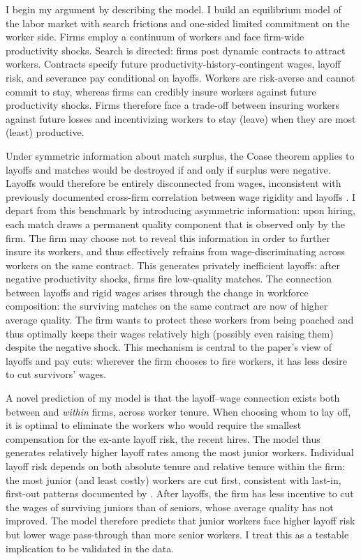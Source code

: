 I begin my argument by describing the model. I build an equilibrium model of the labor market with search frictions and one-sided limited commitment on the worker side. Firms employ a continuum of workers and face firm-wide productivity shocks. Search is directed: firms post dynamic contracts to attract workers. Contracts specify future productivity-history-contingent wages, layoff risk, and severance pay conditional on layoffs. Workers are risk-averse and cannot commit to stay, whereas firms can credibly insure workers against future productivity shocks. Firms therefore face a trade-off between insuring workers against future losses and incentivizing workers to stay (leave) when they are most (least) productive.
 
Under symmetric information about match surplus, the Coase theorem applies to layoffs and matches would be destroyed if and only if surplus were negative. Layoffs would therefore be entirely disconnected from wages, inconsistent with previously documented cross-firm correlation between wage rigidity and layoffs \parencite[]{dias2013,enrlich2024}. I depart from this benchmark by introducing asymmetric information: upon hiring, each match draws a permanent quality component that is observed only by the firm. The firm may choose not to reveal this information in order to further insure its workers, and thus effectively refrains from wage-discriminating across workers on the same contract. This generates privately inefficient layoffs: after negative productivity shocks, firms fire low-quality matches. The connection between layoffs and rigid wages arises through the change in workforce composition: the surviving matches on the same contract are now of higher average quality. The firm wants to protect these workers from being poached and thus optimally keeps their wages relatively high (possibly even raising them) despite the negative shock. This mechanism is central to the paper’s view of layoffs and pay cuts: wherever the firm chooses to fire workers, it has less desire to cut survivors’ wages.

A novel prediction of my model is that the layoff–wage connection exists both between and \textit{within} firms, across worker tenure. When choosing whom to lay off, it is optimal to eliminate the workers who would require the smallest compensation for the ex-ante layoff risk, the recent hires. The model thus generates relatively higher layoff rates among the most junior workers. Individual layoff risk depends on both absolute tenure and relative tenure within the firm: the most junior (and least costly) workers are cut first, consistent with last-in, first-out patterns documented by \textcite{buhai2014}. After layoffs, the firm has less incentive to cut the wages of surviving juniors than of seniors, whose average quality has not improved. The model therefore predicts that junior workers face higher layoff risk but lower wage pass-through than more senior workers. I treat this as a testable implication to be validated in the data.

